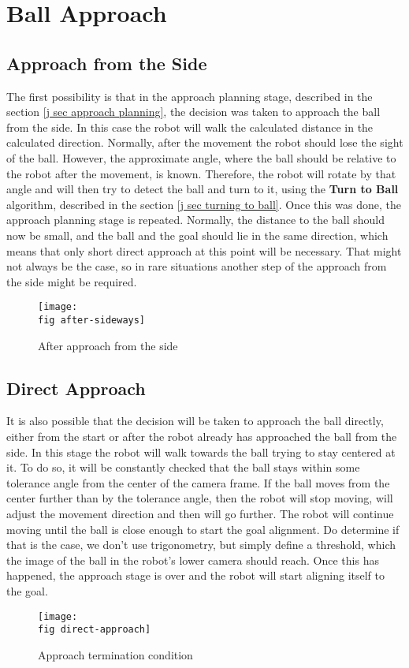 \section{Ball Approach}
\label{p sec approach}

\subsection*{Approach from the Side}

The first possibility is that in the approach planning stage, described in the
section \ref{j sec approach planning}, the decision was taken to approach the
ball from the side. In this case the robot will walk the calculated distance in
the calculated direction. Normally, after the movement the robot should lose
the sight of the ball. However, the approximate angle, where the ball should be
relative to the robot after the movement, is known. Therefore, the robot will
rotate by that angle and will then try to detect the ball and turn to it, using
the \textbf{Turn to Ball} algorithm, described in the section \ref {j sec
  turning to ball}. Once this was done, the approach planning stage is
repeated. Normally, the distance to the ball should now be small, and the ball
and the goal should lie in the same direction, which means that only short
direct approach at this point will be necessary. That might not always be the
case, so in rare situations another step of the approach from the side might be
required.

\begin{figure}[ht]
  \texttt{[image: \\fig after-sideways]}
  \caption{After approach from the side}
  \label{p figure after-sideways}
\end{figure}

\subsection*{Direct Approach}

It is also possible that the decision will be taken to approach the ball
directly, either from the start or after the robot already has approached the
ball from the side. In this stage the robot will walk towards the ball trying
to stay centered at it. To do so, it will be constantly checked that the ball
stays within some tolerance angle from the center of the camera frame. If the
ball moves from the center further than by the tolerance angle, then the robot
will stop moving, will adjust the movement direction and then will go further.
The robot will continue moving until the ball is close enough to start the goal
alignment. Do determine if that is the case, we don't use trigonometry, but
simply define a threshold, which the image of the ball in the robot's lower
camera should reach. Once this has happened, the approach stage is over and the
robot will start aligning itself to the goal.

\begin{figure}[ht]
  \texttt{[image: \\fig direct-approach]}
  \caption{Approach termination condition}
  \label{p figure direct-approach}
\end{figure}
